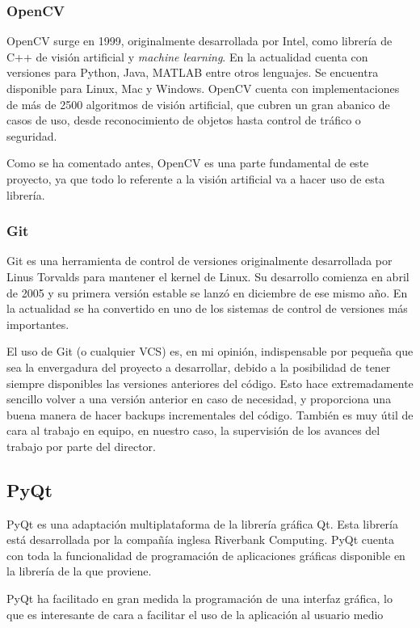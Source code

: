 \subsubsection*{OpenCV}
OpenCV surge en 1999, originalmente desarrollada por Intel, como librería de C++ de visión artificial y \textit{machine learning}. En la actualidad cuenta con versiones para Python, Java, MATLAB entre otros lenguajes. Se encuentra disponible para Linux, Mac y Windows. OpenCV cuenta con implementaciones de más de 2500 algoritmos de visión artificial, que cubren un gran abanico de casos de uso, desde reconocimiento de objetos hasta control de tráfico o seguridad.

Como se ha comentado antes, OpenCV es una parte fundamental de este proyecto, ya que todo lo referente a la visión artificial va a hacer uso de esta librería.

\subsubsection*{Git}
Git es una herramienta de control de versiones originalmente desarrollada por Linus Torvalds para mantener el kernel de Linux. Su desarrollo comienza en abril de 2005 y su primera versión estable se lanzó en diciembre de ese mismo año. En la actualidad se ha convertido en uno de los sistemas de control de versiones más importantes.

El uso de Git (o cualquier VCS) es, en mi opinión, indispensable por pequeña que sea la envergadura del proyecto a desarrollar, debido a la posibilidad de tener siempre disponibles las versiones anteriores del código. Esto hace extremadamente sencillo volver a una versión anterior en caso de necesidad, y proporciona una buena manera de hacer backups incrementales del código. También es muy útil de cara al trabajo en equipo, en nuestro caso, la supervisión de los avances del trabajo por parte del director.

\subsection*{PyQt}
PyQt es una adaptación multiplataforma de la librería gráfica Qt. Esta librería está desarrollada por la compañía inglesa Riverbank Computing. PyQt cuenta con toda la funcionalidad de programación de aplicaciones gráficas disponible en la librería de la que proviene.

PyQt ha facilitado en gran medida la programación de una interfaz gráfica, lo que es interesante de cara a facilitar el uso de la aplicación al usuario medio